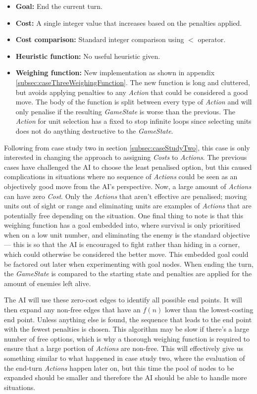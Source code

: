\documentclass[11pt, a4paper]{report}
\begin{document}
\begin{itemize}
  \item \textbf{Goal:} End the current turn.
  \item \textbf{Cost:} A single integer value that increases based on the penalties applied.
  \item \textbf{Cost comparison:} Standard integer comparison using $<$ operator.
  \item \textbf{Heuristic function:} No useful heuristic given.
  \item \textbf{Weighing function:} New implementation as shown in appendix \ref{subsec:caseThreeWeighingFunction}. The new function is long and cluttered, but avoids applying penalties to any \emph{Action} that could be considered a good move. The body of the function is split between every type of \emph{Action} and will only penalise if the resulting \emph{GameState} is worse than the previous. The \emph{Action} for unit selection has a fixed to stop infinite loops since selecting units does not do anything destructive to the \emph{GameState}.
\end{itemize}

Following from case study two in section \ref{subsec:caseStudyTwo}, this case is only interested in changing the approach to assigning \emph{Costs} to \emph{Actions}. The previous cases have challenged the AI to choose the least penalised option, but this caused complications in situations where no sequence of \emph{Actions} could be seen as an objectively good move from the AI's perspective. Now, a large amount of \emph{Actions} can have zero \emph{Cost}. Only the \emph{Actions} that aren't effective are penalised; moving units out of sight or range and eliminating units are examples of \emph{Actions} that are potentially free depending on the situation. One final thing to note is that this weighing function has a goal embedded into, where survival is only prioritised when on a low unit number, and eliminating the enemy is the standard objective --- this is so that the AI is encouraged to fight rather than hiding in a corner, which could otherwise be considered the better move. This embedded goal could be factored out later when experimenting with goal nodes. When ending the turn, the \emph{GameState} is compared to the starting state and penalties are applied for the amount of enemies left alive. 

The AI will use these zero-cost edges to identify all possible end points. It will then expand any non-free edges that have an $f(n)$ lower than the lowest-costing end point. Unless anything else is found, the sequence that leads to the end point with the fewest penalties is chosen. This algorithm may be slow if there's a large number of free options, which is why a thorough weighing function is required to ensure that a large portion of \emph{Actions} are non-free. This will effectively give us something similar to what happened in case study two, where the evaluation of the end-turn \emph{Actions} happen later on, but this time the pool of nodes to be expanded should be smaller and therefore the AI should be able to handle more situations.
\end{document}
